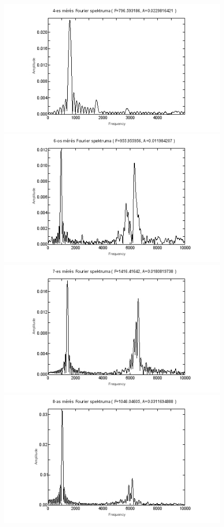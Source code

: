 \documentclass[12pt,a4paper]{article}
\begin{document}
\begin{figure}[!h]
\hspace*{-1.0cm}
\includegraphics[scale=0.5]{4esFour}
\hspace*{-1.0cm}
\includegraphics[scale=0.5]{6osFour}
\hspace*{-1.0cm}
\includegraphics[scale=0.5]{7esFour}
\hspace*{-1.0cm}
\includegraphics[scale=0.5]{8asFour}

\end{figure}
\end{document}
